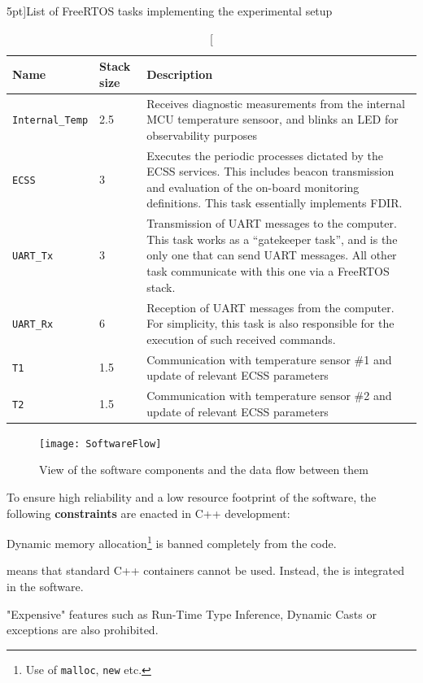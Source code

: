 \documentclass[a4paper,nobib]{tufte-book}
\begin{document}
\begin{table}[h]
	\centering
	\caption[][5pt]{List of Free\acs{RTOS} tasks implementing the experimental setup}
	\label{tab:rtos-tasks}
	\renewcommand{\arraystretch}{1.5}
	\begin{tabularx}{\textwidth}{@{}llX@{}}
		\toprule
		Name & Stack size & Description \\ \midrule
		\texttt{Internal\_Temp} & \SI{2.5}{\kilo\byte} & Receives diagnostic measurements from the internal \acs{MCU} temperature sensoor, and blinks an \acs{LED} for observability purposes \\
		\texttt{ECSS} & \SI{3}{\kilo\byte} & Executes the periodic processes dictated by the \acs{ECSS} services. This includes beacon transmission and evaluation of the on-board monitoring definitions. This task essentially implements \acs{FDIR}. \\
		\texttt{\acs{UART}\_Tx} & \SI{3}{\kilo\byte} & Transmission of \acs{UART} messages to the computer. This task works as a ``gatekeeper task'', and is the only one that can send \acs{UART} messages. All other task communicate with this one via a Free\acs{RTOS} stack. \\
		\texttt{\acs{UART}\_Rx} & \SI{6}{\kilo\byte} & Reception of \acs{UART} messages from the computer. For simplicity, this task is also responsible for the execution of such received commands. \\
		\texttt{T1} & \SI{1.5}{\kilo\byte} & Communication with temperature sensor \#1 and update of relevant \acs{ECSS} parameters \\
		\texttt{T2} & \SI{1.5}{\kilo\byte} & Communication with temperature sensor \#2 and update of relevant \acs{ECSS} parameters \\ \bottomrule
	\end{tabularx}
\end{table}

\begin{figure}[h]
	\texttt{[image: SoftwareFlow]}
	\caption{View of the software components and the data flow between them}
	\label{sec:softwareflow}
\end{figure}

To ensure high reliability and a low resource footprint of the software, the following \textbf{constraints} are enacted in C++ development:
\begin{compactenum}
	\item Dynamic memory allocation\footnote{Use of \texttt{malloc}, \texttt{new} etc.} is banned completely from the code.
	\label{itm:malloc}
	\item {} means that standard C++ containers cannot be used. Instead, the  is integrated in the software.
	\item "Expensive" features such as Run-Time Type Inference, Dynamic Casts or exceptions are also prohibited.
\end{compactenum}
\end{document}
